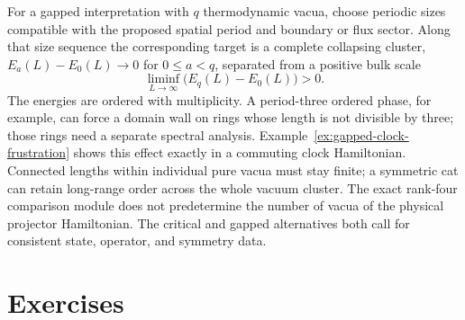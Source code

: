 For a gapped interpretation with $q$ thermodynamic vacua, choose
periodic sizes compatible with the proposed spatial period and
boundary or flux sector. Along that size sequence the corresponding
target is a complete collapsing cluster,
$E_a(L)-E_0(L)\to0$ for $0\leq a<q$, separated from a positive
bulk scale
\[
 \liminf_{L\to\infty}\bigl(E_q(L)-E_0(L)\bigr)>0.
\]
The energies are ordered with multiplicity. A period-three ordered
phase, for example, can force a domain wall on rings whose length is
not divisible by three; those rings need a separate spectral analysis.
Example~\ref{ex:gapped-clock-frustration} shows this effect exactly
in a commuting clock Hamiltonian.
Connected lengths within
individual pure vacua must stay finite; a symmetric cat can retain
long-range order across the whole vacuum cluster. The exact rank-four
comparison module does not predetermine the number of vacua of the
physical projector Hamiltonian. The critical and gapped alternatives
both call for consistent state, operator, and symmetry data.

\section{Exercises}


